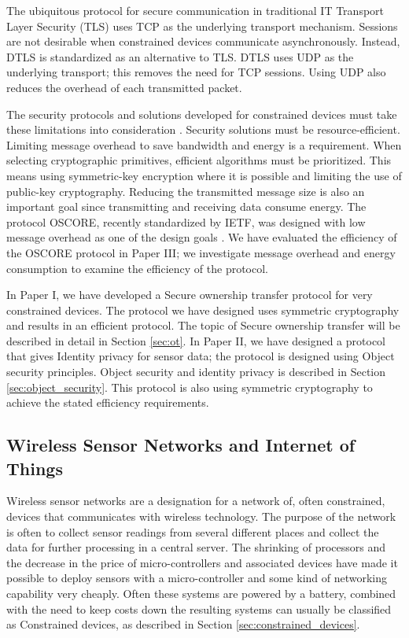 The ubiquitous protocol for secure communication in traditional IT Transport Layer Security (TLS) \cite{RFC8446} uses TCP as the underlying transport mechanism. Sessions are not desirable when constrained devices communicate asynchronously. Instead, DTLS is standardized as an alternative to TLS. DTLS uses UDP as the underlying transport; this removes the need for TCP sessions. Using UDP also reduces the overhead of each transmitted packet.

The security protocols and solutions developed for constrained devices must take these limitations into consideration \cite{I-D.irtf-t2trg-iot-seccons}. Security solutions must be resource-efficient. Limiting message overhead to save bandwidth and energy is a requirement. When selecting cryptographic primitives, efficient algorithms must be prioritized. This means using symmetric-key encryption where it is possible and limiting the use of public-key cryptography. Reducing the transmitted message size is also an important goal since transmitting and receiving data consume energy. The protocol OSCORE, recently standardized by IETF, was designed with low message overhead as one of the design goals \cite{RFC8613}. We have evaluated the efficiency of the OSCORE protocol in Paper III; we investigate message overhead and energy consumption to examine the efficiency of the protocol. 

In Paper I, we have developed a Secure ownership transfer protocol for very constrained devices. The protocol we have designed uses symmetric cryptography and results in an efficient protocol. The topic of Secure ownership transfer will be described in detail in Section \ref{sec:ot}. In Paper II, we have designed a protocol that gives Identity privacy for sensor data; the protocol is designed using Object security principles. Object security and identity privacy is described in Section \ref{sec:object_security}. This protocol is also using symmetric cryptography to achieve the stated efficiency requirements. 

\subsection{Wireless Sensor Networks and Internet of Things}
\label{subsec:wsn_iot}
Wireless sensor networks are a designation for a network of, often constrained, devices that communicates with wireless technology. The purpose of the network is often to collect sensor readings from several different places and collect the data for further processing in a central server. 
The shrinking of processors and the decrease in the price of micro-controllers and associated devices have made it possible to deploy sensors with a micro-controller and some kind of networking capability very cheaply. Often these systems are powered by a battery, combined with the need to keep costs down the resulting systems can usually be classified as Constrained devices, as described in Section \ref{sec:constrained_devices}. 

